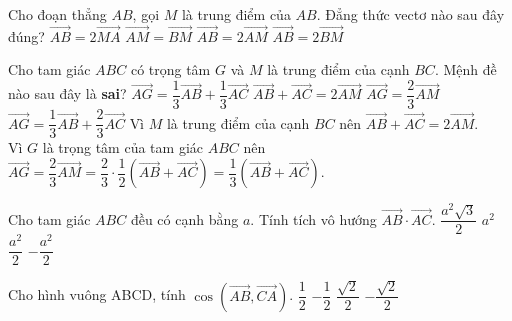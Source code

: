 \begin{ex}%
	Cho đoạn thẳng $AB$, gọi $M$ là trung điểm của $AB$. Đẳng thức vectơ nào sau đây đúng?
	\choice
	{$\overrightarrow{AB}=2\overrightarrow{MA}$}
	{$\overrightarrow{AM}=\overrightarrow{BM}$}
	{\True $\overrightarrow{AB}=2\overrightarrow{AM}$}
	{$\overrightarrow{AB}=2\overrightarrow{BM}$}
\end{ex}

\begin{ex}%
	Cho tam giác $A B C$ có trọng tâm $G$ và $M$ là trung điểm của cạnh $B C$. Mệnh đề nào sau đây là \textbf{sai}?
	\choice
	{$\overrightarrow{A G}=\dfrac{1}{3} \overrightarrow{A B}+\dfrac{1}{3} \overrightarrow{A C}$}
	{$\overrightarrow{A B}+\overrightarrow{A C}=2 \overrightarrow{A M}$}
	{$\overrightarrow{A G}=\dfrac{2}{3} \overrightarrow{A M}$}
	{\True $\overrightarrow{A G}=\dfrac{1}{3} \overrightarrow{A B}+\dfrac{2}{3} \overrightarrow{A C}$}
	\loigiai
	{
		Vì $M$ là trung điểm của cạnh $B C$ nên $\overrightarrow{A B}+\overrightarrow{A C}=2 \overrightarrow{A M}$.\\
		Vì $G$ là trọng tâm của tam giác $A B C$ nên $\overrightarrow{A G}=\dfrac{2}{3} \overrightarrow{A M}=\dfrac{2}{3} \cdot \dfrac{1}{2}(\overrightarrow{A B}+\overrightarrow{A C})=\dfrac{1}{3}(\overrightarrow{A B}+\overrightarrow{A C})$.
	}
\end{ex}

\begin{ex}%
	Cho tam giác $ABC$ đều có cạnh bằng $a$. Tính tích vô hướng $\overrightarrow{AB} \cdot \overrightarrow{AC}$.
	\choice
	{$\dfrac{a^2\sqrt{3}}{2}$}
	{$a^2$}
	{\True $\dfrac{a^2}{2}$}
	{$-\dfrac{a^2}{2}$}
\end{ex}

\begin{ex}%
	Cho hình vuông ABCD, tính $ \cos\left(\overrightarrow{AB},\overrightarrow{CA}\right)$.
	\choice
	{$\dfrac{1}{2}$}
	{$-\dfrac{1}{2}$}
	{$\dfrac{\sqrt{2}}{2}$}
	{\True $-\dfrac{\sqrt{2}}{2}$}
\end{ex}

